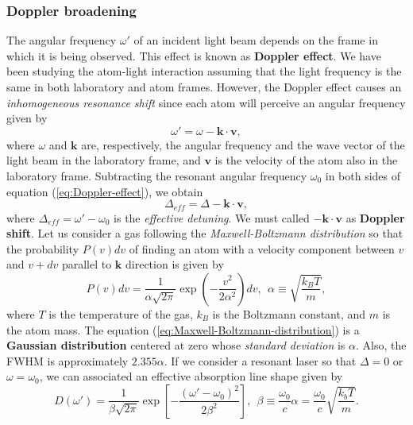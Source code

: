 {%
\subsubsection{Doppler broadening}
\label{sec:Doppler-broadening}

The angular frequency $ \omega' $ of an incident light beam depends on the frame in which it is being observed. This effect is known as \textbf{Doppler effect}. We have been studying the atom-light interaction assuming that the light frequency is the same in both laboratory and atom frames. However, the Doppler effect causes an \textit{inhomogeneous resonance shift} since each atom will perceive an angular frequency given by
\begin{equation}
	\omega' = \omega - \mathbf{k} \cdot \mathbf{v},
	\label{eq:Doppler-effect}
\end{equation}
where $ \omega $ and $ \mathbf{k} $ are, respectively, the angular frequency and the wave vector of the light beam in the laboratory frame, and $ \mathbf{v} $ is the velocity of the atom also in the laboratory frame. Subtracting the resonant angular frequency $ \omega_0 $ in both sides of equation (\ref{eq:Doppler-effect}), we obtain
\begin{equation}
	\Delta_{eff} = \Delta - \mathbf{k} \cdot \mathbf{v},
	\label{eq:Doppler-shift}
\end{equation}
where $ \Delta_{eff} = \omega' - \omega_0 $ is the \textit{effective detuning}. We must called $ -\mathbf{k} \cdot \mathbf{v} $ as \textbf{Doppler shift}. Let us consider a gas following the \textit{Maxwell-Boltzmann distribution} so that the probability $ P(v) dv $ of finding an atom with a velocity component between $ v $ and $ v + dv $ parallel to $ \mathbf{k} $ direction is given by
\begin{equation}
	P(v) dv = \frac{1}{\alpha\sqrt{2\pi}} \exp\left(-\frac{v^2}{2\alpha^2}\right) dv,\ \ \alpha \equiv \sqrt{\frac{k_B T}{m}},
	\label{eq:Maxwell-Boltzmann-distribution}
\end{equation}
where $ T $ is the temperature of the gas, $ k_B $ is the Boltzmann constant, and $ m $ is the atom mass. The equation (\ref{eq:Maxwell-Boltzmann-distribution}) is a \textbf{Gaussian distribution} centered at zero whose \textit{standard deviation} is $ \alpha $. Also, the FWHM is approximately $ 2.355 \alpha $. If we consider a resonant laser so that $ \Delta = 0 $ or $ \omega = \omega_0 $, we can associated an effective absorption line shape given by
\begin{equation}
	D(\omega') = \frac{1}{\beta \sqrt{2\pi}} \exp\left[-\frac{(\omega' - \omega_0)^2}{2\beta^2}\right],\ \ \beta \equiv \frac{\omega_0}{c} \alpha = \frac{\omega_0}{c} \sqrt{\frac{k_b T}{m}}.
\end{equation}

}
